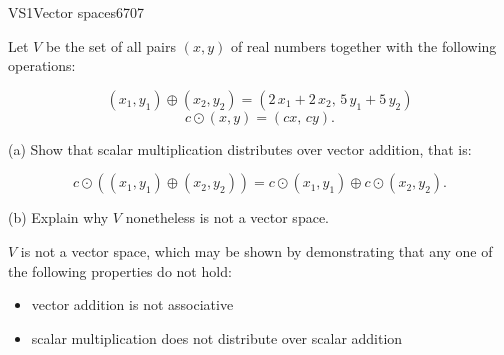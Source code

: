 \begin{exercise}{VS1}{Vector spaces}{6707} 
\begin{exerciseStatement} 

 Let \(V\) be the set of all pairs \((x,y)\) of real numbers together with the following operations: 

 \[(x_1,y_1)\oplus (x_2,y_2)=\left(2 \, x_{1} + 2 \, x_{2},\,5 \, y_{1} + 5 \, y_{2}\right)\]\[c \odot (x,y) =\left(c x,\,c y\right).\] 

 (a) Show that scalar multiplication distributes over vector addition, that is: 

 \[
      c\odot \left((x_1,y_1)\oplus(x_2,y_2)\right)=c\odot(x_1,y_1)\oplus c\odot(x_2,y_2).
    \] 

 (b) Explain why \(V\) nonetheless is not a vector space. 

 \end{exerciseStatement}
 \begin{exerciseAnswer} 

 \(V\) is not a vector space, which may be shown by demonstrating that any one of the following properties do not hold: 

 

\begin{itemize}
\item vector addition is not associative
\item scalar multiplication does not distribute over scalar addition
\end{itemize}

     \end{exerciseAnswer}
 \end{exercise}


